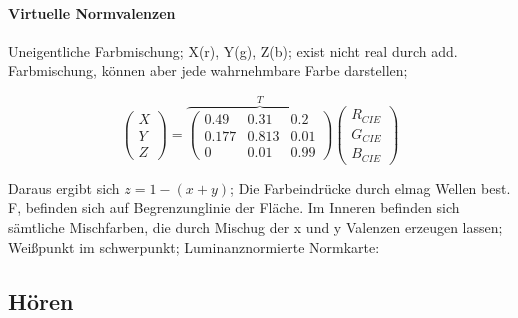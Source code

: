 \documentclass[6pt,a4paper]{scrartcl}
\begin{document}
\begin{multicols*}{4}
{\paragraph{Virtuelle Normvalenzen} Uneigentliche Farbmischung; X(r), Y(g), Z(b); exist nicht real durch add. Farbmischung, können aber jede wahrnehmbare Farbe darstellen; 


\begin{equation*}
	\begin{pmatrix} 	X \\ Y \\ Z \end{pmatrix} = \overbrace{\begin{pmatrix}
	0.49 & 0.31 & 0.2 \\
	0.177 & 0.813 & 0.01 \\
	0 & 0.01 & 0.99
\end{pmatrix} }^T\begin{pmatrix}
	R_{CIE} \\ G_{CIE} \\ B_{CIE}
\end{pmatrix}
\end{equation*}

Daraus ergibt sich $z = 1 - (x+y)$; Die Farbeindrücke durch elmag Wellen best. F, befinden sich auf Begrenzunglinie der Fläche. Im Inneren befinden sich sämtliche Mischfarben, die durch Mischug der x und y Valenzen erzeugen lassen; Weißpunkt im schwerpunkt; Luminanznormierte Normkarte: 
\vspace{0.3em}


\vspace{0.3em}

}


\subsection{Hören}

\end{multicols*}
\end{document}
